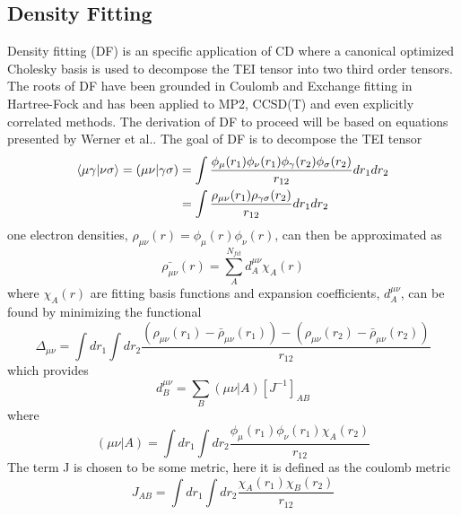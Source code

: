	\subsection{Density Fitting}
		Density fitting (DF) is an specific application of CD where a canonical optimized Cholesky basis is used to decompose the TEI tensor into two third order tensors.  The roots of DF have been grounded in Coulomb\cite{Ten-no 1995, Vahtras 1993} and Exchange\cite{Weigend 2002} fitting in Hartree-Fock and has been applied to MP2\cite{Feyereisen 1993}, CCSD(T)\cite{Rendell 1994} and even explicitly correlated methods\cite{Manby 2003}.  The derivation of DF to proceed will be based on equations presented by Werner et al.\cite{Werner 2003}. The goal of DF is to decompose the TEI tensor
			\begin{equation}
				\begin{aligned}
			\langle\mu\gamma|\nu\sigma\rangle = (\mu\nu|\gamma\sigma) &= \int\frac{\phi_\mu(r_1) \phi_\nu(r_1) \phi_\gamma(r_2)\phi_\sigma(r_2)}{r_{12}} dr_1 dr_2\\
			&= \int \frac{\rho_{\mu\nu}(r_1)\rho_{\gamma\sigma}(r_2)}{r_{12}}dr_1 dr_2
				\end{aligned}
			\end{equation}
		one electron densities, $\rho_{\mu\nu}(r) = \phi_\mu(r) \phi_\nu(r)$, can then be approximated as 
			\begin{equation}
				\bar{\rho_{\mu\nu}}(r) = \sum_A^{N_{fit}} d^{\mu\nu}_A \chi_A(r)
			\end{equation}
		where $\chi_A(r)$ are fitting basis functions and expansion coefficients, $d^{\mu\nu}_A$, can be found by minimizing the functional 
			\begin{equation}
				\Delta_{\mu\nu} = \int dr_1 \int dr_2 \frac{(\rho_{\mu\nu}(r_1)-\bar{\rho}_{\mu\nu}(r_1)) - (\rho_{\mu\nu}(r_2) - \bar{\rho}_{\mu\nu}(r_2))}{r_{12}}
			\end{equation}
		which provides 
			\begin{equation}
				d^{\mu\nu}_B = \sum_B (\mu\nu|A)[J^{-1}]_{AB}
			\end{equation}
		where 
			\begin{equation}
				(\mu\nu|A) = \int dr_1 \int dr_2 \frac{\phi_\mu(r_1)\phi_\nu(r_1)\chi_A(r_2)}{r_{12}}
			\end{equation}
		The term J is chosen to be some metric, here it is defined as the coulomb metric\cite{Dunlap 1977, Dunlap 1979}
			\begin{equation}
				J_{AB} = \int dr_1 \int dr_2 \frac{\chi_A(r_1) \chi_B(r_2)}{r_{12}}
			\end{equation}
